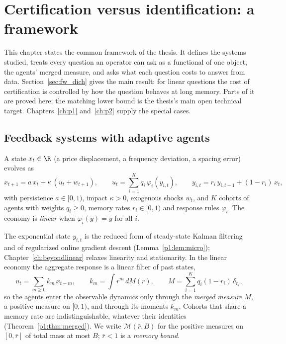 \chapter{Certification versus identification: a framework}\label{ch:framework}

This chapter states the common framework of the thesis. It defines the systems studied, treats every question an operator can ask as a functional of one object, the agents' merged measure, and asks what each question costs to answer from data. Section~\ref{sec:fw_dich} gives the main result: for linear questions the cost of certification is controlled by how the question behaves at long memory. Parts of it are proved here; the matching lower bound is the thesis's main open technical target. Chapters~\ref{ch:p1} and~\ref{ch:p2} supply the special cases.

\section{Feedback systems with adaptive agents}\label{sec:fw_model}

\begin{definition}\label{def:cohort}
A state $x_t\in\R$ (a price displacement, a frequency deviation, a spacing error) evolves as
\begin{equation}\label{eq:fw_plant}
x_{t+1}=a\,x_t+\kappa\,(u_t+w_{t+1}),\qquad u_t=\sum_{i=1}^K q_i\,\varphi_i(y_{i,t}),\qquad y_{i,t}=r_i\,y_{i,t-1}+(1-r_i)\,x_t,
\end{equation}
with persistence $a\in[0,1)$, impact $\kappa>0$, exogenous shocks $w_t$, and $K$ cohorts of agents with weights $q_i\ge0$, memory rates $r_i\in[0,1)$ and response rules $\varphi_i$. The economy is \emph{linear} when $\varphi_i(y)=y$ for all $i$.
\end{definition}

The exponential state $y_{i,t}$ is the reduced form of steady-state Kalman filtering and of regularized online gradient descent (Lemma~\ref{p1:lem:micro}); Chapter~\ref{ch:beyondlinear} relaxes linearity and stationarity. In the linear economy the aggregate response is a linear filter of past states,
\[
u_t=\sum_{m\ge0}k_m\,x_{t-m},\qquad k_m=\int r^m\,dM(r),\qquad M=\sum_{i=1}^K q_i(1-r_i)\,\delta_{r_i},
\]
so the agents enter the observable dynamics only through the \emph{merged measure} $M$, a positive measure on $[0,1)$, and through its moments $k_m$. Cohorts that share a memory rate are indistinguishable, whatever their identities (Theorem~\ref{p1:thm:merged}). We write $\mathcal M(\bar r,B)$ for the positive measures on $[0,\bar r]$ of total mass at most $B$; $\bar r<1$ is a \emph{memory bound}.

